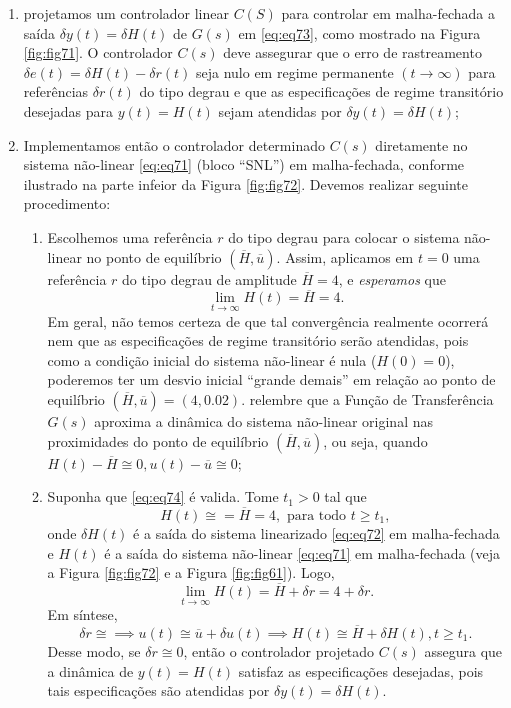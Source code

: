 \documentclass[
]{book}
\providecommand{\tightlist}{%
  \setlength{\itemsep}{0pt}\setlength{\parskip}{0pt}}
\theoremstyle{definition}
\theoremstyle{definition}
\theoremstyle{definition}
\theoremstyle{remark}
\begin{document}
\begin{enumerate}
\def\labelenumi{\arabic{enumi}.}
\tightlist
\item
  projetamos um controlador linear \(C(S)\) para controlar em malha-fechada a saída \(\delta y(t) = \delta H(t)\) de \(G(s)\) em \eqref{eq:eq73}, como mostrado na Figura \ref{fig:fig71}. O controlador \(C(s)\) deve assegurar que o erro de rastreamento \(\delta e(t) = \delta H(t) - \delta r(t)\) seja nulo em regime permanente \((t\to\infty)\) para referências \(\delta r(t)\) do tipo degrau e que as especificações de regime transitório desejadas para \(y(t) = H(t)\) sejam atendidas por \(\delta y(t) = \delta H(t)\);
\item
  Implementamos então o controlador determinado \(C(s)\) diretamente no sistema não-linear \eqref{eq:eq71} (bloco ``SNL'') em malha-fechada, conforme ilustrado na parte infeior da Figura \ref{fig:fig72}. Devemos realizar seguinte procedimento:

  \begin{enumerate}
  \def\labelenumii{(\alph{enumii})}
  \tightlist
  \item
    Escolhemos uma referência \(r\) do tipo degrau para colocar o sistema não-linear no ponto de equilíbrio \((\overline{H}, \overline{u})\). Assim, aplicamos em \(t = 0\) uma referência \(r\) do tipo degrau de amplitude \(\overline{H} = 4\), e \emph{esperamos} que
    \[
     \lim\limits_{t\to\infty}{H(t) = \overline{H} = 4}.  \label{eq:eq74}
     \]
    Em geral, não temos certeza de que tal convergência realmente ocorrerá nem que as especificações de regime transitório serão atendidas, pois como a condição inicial do sistema não-linear é nula (\(H(0) = 0\)), poderemos ter um desvio inicial ``grande demais'' em relação ao ponto de equilíbrio \((\overline{H}, \overline{u}) = (4, 0.02)\). relembre que a Função de Transferência \(G(s)\) aproxima a dinâmica do sistema não-linear original nas proximidades do ponto de equilíbrio \((\overline{H}, \overline{u})\), ou seja, quando \(H(t) - \overline{H} \cong 0, u(t) - \overline{u} \cong0\);
  \item
    Suponha que \eqref{eq:eq74} é valida. Tome \(t_1 > 0\) tal que
    \[
     H(t) \cong = \overline{H} = 4, \text{ para todo }t \geq t_1, \label{eq:eq75}
     \]
    onde \(\delta H(t)\) é a saída do sistema linearizado \eqref{eq:eq72} em malha-fechada e \(H(t)\) é a saída do sistema não-linear \eqref{eq:eq71} em malha-fechada (veja a Figura \ref{fig:fig72} e a Figura \ref{fig:fig61}). Logo,
    \[
     \lim_{t\to\infty}{H(t)} = \overline{H} + \delta r = 4 + \delta r.
     \]
    Em síntese,
    \[
     \boxed{\delta r \cong \implies u(t) \cong \overline{u} + \delta u(t) \implies H(t) \cong \overline{H} + \delta H(t), t\geq t_1}. \label{eq:eq76}
     \]
    Desse modo, se \(\delta r \cong 0\), então o controlador projetado \(C(s)\) assegura que a dinâmica de \(y(t) = H(t)\) satisfaz as especificações desejadas, pois tais especificações são atendidas por \(\delta y(t) = \delta H(t)\).
  \end{enumerate}
\end{enumerate}
\end{document}
